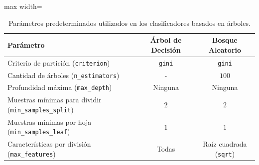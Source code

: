 \documentclass[a4paper,11pt ,openany]{book}
\begin{document}
{\begin{table}[H]
    \centering
    \renewcommand{\arraystretch}{1.5}
    \caption{Parámetros predeterminados utilizados en los clasificadores basados en árboles.}
    \begin{adjustbox}{max width=\textwidth}
    \begin{tabular}{|l|c|c|}
        \hline
        \textbf{Parámetro} & \textbf{Árbol de Decisión} & \textbf{Bosque Aleatorio} \\
        \hline
        Criterio de partición (\texttt{criterion}) & \texttt{gini} & \texttt{gini} \\
        \hline
        Cantidad de árboles (\texttt{n\_estimators}) & - & $100$ \\
        \hline
        Profundidad máxima (\texttt{max\_depth}) & Ninguna & Ninguna \\
        \hline
        Muestras mínimas para dividir (\texttt{min\_samples\_split}) & $2$ & $2$ \\
        \hline
        Muestras mínimas por hoja (\texttt{min\_samples\_leaf}) & $1$ & $1$ \\
        \hline
        Características por división (\texttt{max\_features}) & Todas & Raíz cuadrada (\texttt{sqrt}) \\
        \hline
    \end{tabular}
    \end{adjustbox}
    \label{tab:parametros_arboles}
\end{table}}
\end{document}
